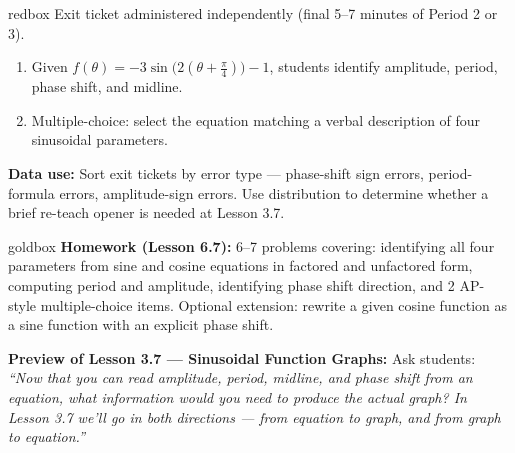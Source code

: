 \documentclass[10pt]{article}
\begin{document}
\vspace{0.08in}

\begin{skillbox}{redbox}
Exit ticket administered independently (final 5--7 minutes of Period 2 or 3).

\begin{enumerate}[leftmargin=1.4em, itemsep=4pt]
  \item Given $f(\theta)=-3\sin\!\bigl(2(\theta+\tfrac{\pi}{4})\bigr)-1$,
    students identify amplitude, period, phase shift, and midline.
  \item Multiple-choice: select the equation matching a verbal description
    of four sinusoidal parameters.
\end{enumerate}

\textbf{Data use:} Sort exit tickets by error type --- phase-shift sign
errors, period-formula errors, amplitude-sign errors. Use distribution
to determine whether a brief re-teach opener is needed at Lesson 3.7.
\end{skillbox}

\vspace{0.08in}

\begin{skillbox}{goldbox}
\textbf{Homework (Lesson 6.7):} 6--7 problems covering: identifying all
four parameters from sine and cosine equations in factored and unfactored
form, computing period and amplitude, identifying phase shift direction,
and 2 AP-style multiple-choice items. Optional extension: rewrite a given
cosine function as a sine function with an explicit phase shift.

\textbf{Preview of Lesson 3.7 --- Sinusoidal Function Graphs:}
Ask students: \textit{``Now that you can read amplitude, period, midline,
and phase shift from an equation, what information would you need to
produce the actual graph? In Lesson 3.7 we'll go in both directions ---
from equation to graph, and from graph to equation.''}
\end{skillbox}
\end{document}
